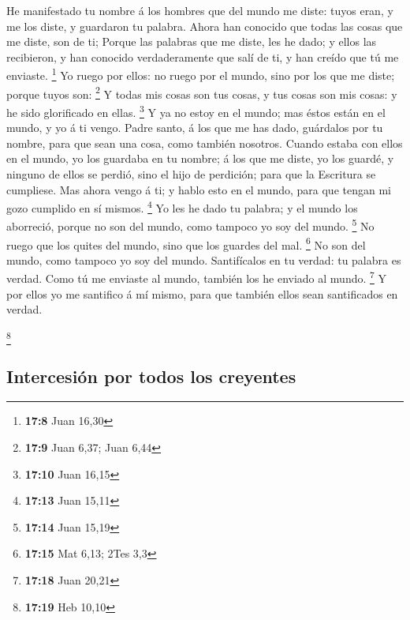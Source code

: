  He manifestado tu nombre á los hombres que del mundo me
diste: tuyos eran, y me los diste, y guardaron tu palabra.
 Ahora han conocido que todas las cosas que me diste, son
de ti;  Porque las palabras que me diste, les he dado; y
ellos las recibieron, y han conocido verdaderamente que salí de ti, y
han creído que tú me enviaste. \footnote{\textbf{17:8} Juan 16,30}
 Yo ruego por ellos: no ruego por el mundo, sino por los
que me diste; porque tuyos son: \footnote{\textbf{17:9} Juan 6,37; Juan
  6,44}  Y todas mis cosas son tus cosas, y tus cosas son
mis cosas: y he sido glorificado en ellas. \footnote{\textbf{17:10} Juan
  16,15}  Y ya no estoy en el mundo; mas éstos están en
el mundo, y yo á ti vengo. Padre santo, á los que me has dado, guárdalos
por tu nombre, para que sean una cosa, como también nosotros.
 Cuando estaba con ellos en el mundo, yo los guardaba en
tu nombre; á los que me diste, yo los guardé, y ninguno de ellos se
perdió, sino el hijo de perdición; para que la Escritura se cumpliese.
 Mas ahora vengo á ti; y hablo esto en el mundo, para que
tengan mi gozo cumplido en sí mismos. \footnote{\textbf{17:13} Juan
  15,11}  Yo les he dado tu palabra; y el mundo los
aborreció, porque no son del mundo, como tampoco yo soy del mundo.
\footnote{\textbf{17:14} Juan 15,19}  No ruego que los
quites del mundo, sino que los guardes del mal. \footnote{\textbf{17:15}
  Mat 6,13; 2Tes 3,3}  No son del mundo, como tampoco yo
soy del mundo.  Santifícalos en tu verdad: tu palabra es
verdad.  Como tú me enviaste al mundo, también los he
enviado al mundo. \footnote{\textbf{17:18} Juan 20,21}  Y
por ellos yo me santifico á mí mismo, para que también ellos sean
santificados en verdad.

\footnote{\textbf{17:19} Heb 10,10}

\hypertarget{intercesiuxf3n-por-todos-los-creyentes}{%
\subsection{Intercesión por todos los
creyentes}\label{intercesiuxf3n-por-todos-los-creyentes}}

